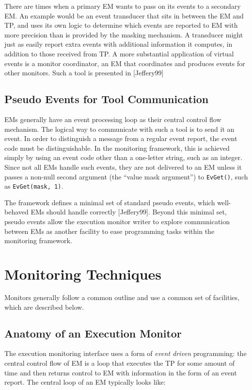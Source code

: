 There are times when a primary EM wants to pass on its events to a
secondary EM.  An example would be an event transducer that sits
in between the EM and TP, and uses its own logic to
determine which events are reported to EM with more precision
than is provided by the masking mechanism.  A transducer might just as
easily report extra events with additional information
it computes, in addition to those received from TP. 
A more substantial application of virtual events is a monitor
coordinator, an EM that coordinates and produces events for
other monitors.  Such a tool is presented in [Jeffery99]

\subsection*{Pseudo Events for Tool Communication}

EMs generally have an event processing loop as their central
control flow mechanism.  The logical way to communicate with such a
tool is to send it an event.  In order to distinguish a message from a
regular event report, the event code must be distinguishable.  In the
monitoring framework, this is achieved simply by using an event code
other than a one-letter string, such as an integer.  Since not all EMs
handle such events, they are not delivered to an EM unless it passes a
non-null second argument (the ``value mask argument'') to {\tt EvGet()},
such as {\tt EvGet(mask,~1)}.

The framework defines a minimal set of standard pseudo events, which
well-behaved EMs should handle correctly [Jeffery99].  Beyond this
minimal set, pseudo events allow
the execution monitor writer to explore communication between EMs as
another facility to ease programming tasks within the monitoring
framework.


\section{Monitoring Techniques}

Monitors generally follow a common outline and use a common set of
facilities, which are described below.

\subsection*{Anatomy of an Execution Monitor}

The execution monitoring interface uses
 
a form of {\em event driven\/} programming: 
the central control flow of EM is a loop that executes the TP
for some amount of time and then returns control to EM
with information in the form of an event report.  The
central loop of an EM typically looks like:

